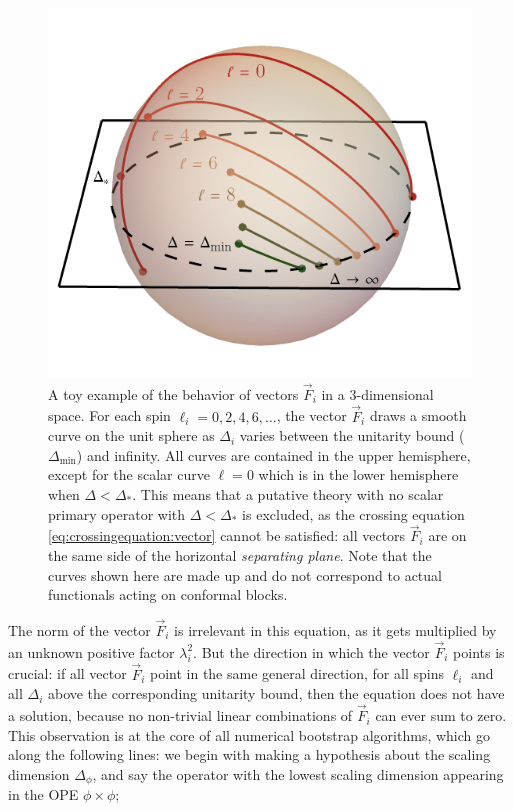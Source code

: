 \documentclass[a4paper,12pt]{article}
\numberwithin{equation}{section}
\begin{document}
\begin{figure}
	\centering
	\includegraphics[width=0.7\linewidth]{figures/separating-plane.pdf}
	\caption{A toy example of the behavior of vectors $\vec{F}_i$
	in a 3-dimensional space.
	For each spin $\ell_i = 0, 2, 4, 6, \ldots$, the vector $\vec{F}_i$
	draws a smooth curve on the unit sphere as $\Delta_i$ varies
	between the unitarity bound ($\Delta_\text{min}$) and infinity.
	All curves are contained in the upper hemisphere, except
	for the scalar curve $\ell = 0$ which is in the lower hemisphere
	when $\Delta < \Delta_*$.
	This means that a putative theory with no scalar primary operator
	with $\Delta < \Delta_*$ is excluded, as the crossing equation 
	\eqref{eq:crossingequation:vector} cannot be satisfied:
	all vectors $\vec{F}_i$ are on the same side of
	the horizontal \emph{separating plane}.
	Note that the curves shown here are made up
	and do not correspond to actual functionals acting on
	conformal blocks.}
	\label{fig:separatingplane}
\end{figure}
%
The norm of the vector $\vec{F}_i$ is irrelevant in this equation, as it gets multiplied by an unknown positive factor $\lambda_i^2$. But the direction in which the vector $\vec{F}_i$ points is crucial: if all vector $\vec{F}_i$ point in the same general direction, for all spins $\ell_i$ and all $\Delta_i$ above the corresponding unitarity bound, then the equation does not have a solution, because no non-trivial linear combinations of $\vec{F}_i$ can ever sum to zero.
This observation is at the core of all numerical bootstrap algorithms, which go along the following lines:
we begin with making a hypothesis about the scaling dimension $\Delta_\phi$, and say the operator with the lowest scaling dimension appearing in the OPE $\phi \times \phi$;%
\end{document}

